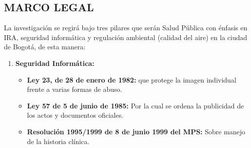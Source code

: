 \documentclass[a4paper, 11pt, oneside]{article}
\theoremstyle{definition}
\theoremstyle{remark}
\begin{document}
\subsection{MARCO LEGAL}

La investigación se regirá bajo tres pilares que serán Salud Pública con énfasis en IRA, seguridad informática y regulación ambiental (calidad del aire) en la ciudad de Bogotá, de esta manera:
\begin{enumerate}[I]%
\item\textbf{Seguridad Informática:}
	\begin{itemize}   
	\item\textbf{Ley 23, de 28 de enero de 1982: }que protege la imagen 		     individual frente a varias formas de abuso.
    \item\textbf{Ley 57 de 5 de junio de 1985: } Por la cual se ordena la 			publicidad de los actos y documentos oficiales.
    \item\textbf{Resolución 1995/1999 de 8 de junio 1999 del MPS: } Sobre manejo 	 de la historia clínica.
   

\end{itemize}
\end{enumerate}
\end{document}
